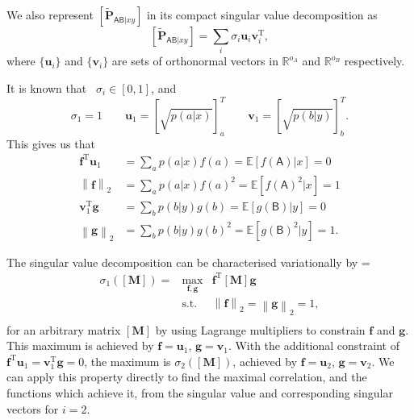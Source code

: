 \documentclass[10pt, a4paper]{article}
\numberwithin{equation}{section} %
\theoremstyle{definition}
\theoremstyle{plain}
\newenvironment{Array}[1] %
{\def\arraystretch{1.75}\everymath={\displaystyle}\begin{equation}\begin{array}{#1}}
{\end{array}\end{equation}}
\newcommand{\norm}[1]{\left\lVert#1\right\rVert}
\newcommand{\?}{\mathrel{?}} %
\newcommand{\R}{\mathbb{R}} %
\newcommand{\cvec}[1]{\boldsymbol{\mathbf{#1}}}    %
\newcommand{\rvec}[1]{\boldsymbol{\mathbf{#1}}^{\mathrm{T}}} %
\newcommand{\matr}[1]{\left[\mathbf{#1}\right]} %
\newcommand{\matrp}[2]{\left[\mathbf{#1}#2\right]} %
\newcommand{\E}{\mathbb{E}} %
\newcommand{\crv}[1]{\mathsf{#1}}
\begin{document}
    We also represent \(\matrp{\tilde{P}}{_{\crv{AB}|xy}}\) in its compact singular value decomposition as
    \begin{equation}
      \matrp{\tilde{P}}{_{\crv{AB}|xy}} = \sum_i \sigma_i \cvec{u}_i \rvec{v}_i,
    \end{equation}
    where \(\{\cvec{u}_i\}\) and \(\{\cvec{v}_i\}\) are sets of orthonormal vectors in \(\R^{o_A}\) and \(\R^{o_B}\) respectively.

    It is known that~\cite[Thm 1]{ComputingMaxCorr} \(\sigma_i \in [0, 1]\), and
    \begin{equation}
      \sigma_1 = 1 \qquad \cvec{u}_1 = {[\sqrt{p(a|x)}]}_a^T \qquad \cvec{v}_1 = {[\sqrt{p(b|y)}]}_b^T.
    \end{equation}
    This gives us that
    \begin{align}
      \rvec{f} \cvec{u}_1 &= \sum_a p(a|x) f(a) = \E[f(\crv{A})|x] = 0 \\
      \norm{\cvec{f}}_2 &= \sum_a p(a|x) {f(a)}^2 = \E[{f(\crv{A})}^2|x] = 1 \\
      \rvec{v}_1 \cvec{g} &= \sum_b p(b|y) g(b) = \E[g(\crv{B})|y] = 0 \\
      \norm{\cvec{g}}_2 &= \sum_b p(b|y) {g(b)}^2 = \E[{g(\crv{B})}^2|y] = 1.
    \end{align}

    The singular value decomposition can be characterised variationally by
    \begin{Array}{rcl}
      \sigma_1(\matr{M}) = & \max_{\cvec{f},\cvec{g}} & \rvec{f} \matr{M} \cvec{g} \\
                            & \text{s.t.} & \norm{\cvec{f}}_2 = \norm{\cvec{g}}_2 = 1, \\
    \end{Array}
    for an arbitrary matrix \(\matr{M}\) by using Lagrange multipliers to constrain \(\cvec{f}\) and \(\cvec{g}\). This maximum is achieved by \(\cvec{f} = \cvec{u}_1\), \(\cvec{g} = \cvec{v}_1\). With the additional constraint of \(\rvec{f} \cvec{u}_1 = \rvec{v}_1 \cvec{g} = 0\), the maximum is \(\sigma_2(\matr{M})\), achieved by \(\cvec{f} = \cvec{u}_2\), \(\cvec{g} = \cvec{v}_2\). We can apply this property directly to find the maximal correlation, and the functions which achieve it, from the singular value and corresponding singular vectors for \(i = 2\).
\end{document}

